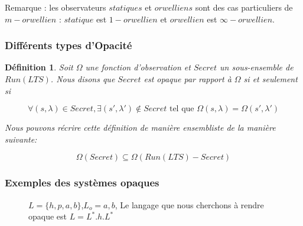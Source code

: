 \documentclass[10pt,a4paper]{article}
\newtheorem{mydef}{D\'efinition}
\begin{document}
	Remarque : les observateurs $statiques$ et $orwelliens$ sont des cas particuliers de $m-orwellien$ : $statique$ est $1-orwellien$ et $orwellien$ est $\infty-orwellien$.

	
\subsubsection{Diff\'erents types d'Opacit\'e}

\begin{mydef}
	Soit $\Omega$ une fonction d'observation et $Secret$ un sous-ensemble de $Run(LTS)$. Nous disons que $Secret$ est opaque par rapport \`a $\Omega$ si et seulement si
	
	$$\forall (s,\lambda) \in Secret, \exists (s',\lambda')\not\in Secret \mbox{ tel que } \Omega(s,\lambda) = \Omega (s',\lambda')$$
	
	Nous pouvons récrire cette définition de manière ensembliste de la manière suivante:
	
	$$\Omega(Secret)\subseteq \Omega(Run(LTS)-Secret)$$
\end{mydef}

\subsubsection{Exemples des syst\`emes opaques}
		\begin{figure}[H]
                \centering
                \caption{$L = \{h,p,a,b\}$,$L_o = {a,b}$, Le langage que nous cherchons \`a rendre opaque est $L = L^*.h.L^*$}
		\end{figure}		
		
\end{document}
